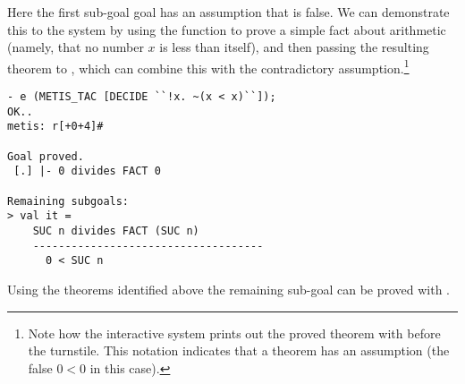  Here the first sub-goal goal has an assumption that is false.  We
 can demonstrate this to the system by using the 
function to prove a simple fact about arithmetic (namely, that no
number $x$ is less than itself), and then passing the resulting
theorem to , which can combine this with the
contradictory assumption.\footnote{Note how the interactive system
  prints out the proved theorem with \ml{[.]} before the
  turnstile.  This notation indicates that a theorem has an
 assumption (the false $0 < 0$ in this case).}

\begin{session}
\begin{verbatim}
- e (METIS_TAC [DECIDE ``!x. ~(x < x)``]);
OK..
metis: r[+0+4]#

Goal proved.
 [.] |- 0 divides FACT 0

Remaining subgoals:
> val it =
    SUC n divides FACT (SUC n)
    ------------------------------------
      0 < SUC n
\end{verbatim}
\end{session}
Using the theorems identified above the remaining sub-goal can
be proved with .

